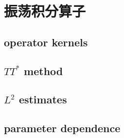 \section{振荡积分算子}
\label{b2:sec:2104}


\subsection{operator kernels}
\label{b2:subsec:210401}

\subsection{\texorpdfstring{\(TT^*\)}{TT*} method}
\label{b2:subsec:210402}

\subsection{\texorpdfstring{\(L^2\)}{L2} estimates}
\label{b2:subsec:210403}

\subsection{parameter dependence}
\label{b2:subsec:210404}


